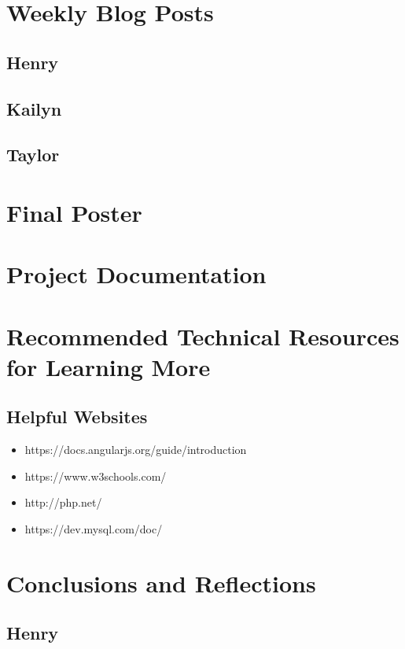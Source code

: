 \documentclass[onecolumn, draftclsnofoot,10pt, compsoc]{IEEEtran}
\begin{document}
\newpage
\section{Weekly Blog Posts}

\subsection{Henry}

\subsection{Kailyn}

\subsection{Taylor}

\newpage
\section{Final Poster}

\newpage
\section{Project Documentation}

\newpage
\section{Recommended Technical Resources for Learning More}
\subsection {Helpful Websites}
\begin{itemize}
\item https://docs.angularjs.org/guide/introduction
\item https://www.w3schools.com/
\item http://php.net/
\item https://dev.mysql.com/doc/
\end{itemize}

\newpage
\section{Conclusions and Reflections}

\subsection{Henry}
\end{document}
